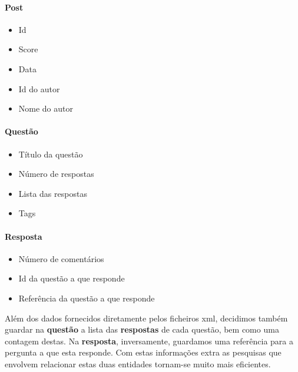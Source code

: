 \documentclass[10pt,a4paper]{report}
\begin{document}
        \paragraph{Post}
            \begin{multicols}{3}
            \begin{itemize}
                \item Id
                \item Score
                \item Data
                \item Id do autor
                \item Nome do autor
            \end{itemize}
        \paragraph{Questão}
            \begin{itemize}
                \item Título da questão
                \item Número de respostas
                \item Lista das respostas
                \item Tags
            \end{itemize}

        \paragraph{Resposta}
            \begin{itemize}
                \item Número de comentários
                \item Id da questão a que responde
                \item Referência da questão a que responde
            \end{itemize}
            \end{multicols}

    Além dos dados fornecidos diretamente pelos ficheiros xml, decidimos também
    guardar na \textbf{questão} a lista das \textbf{respostas} de cada questão,
    bem como uma contagem destas. Na \textbf{resposta}, inversamente, guardamos
    uma referência para a pergunta a que esta responde. Com estas informações
    extra as pesquisas que envolvem relacionar estas duas entidades tornam-se
    muito mais eficientes.
\end{document}
